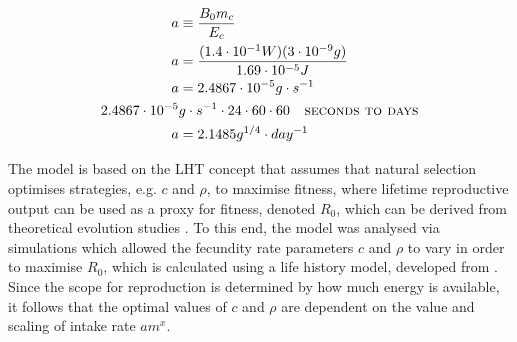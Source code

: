 \documentclass[a4paper]{article} %
\begin{document}
\begin{align*}
    a &\equiv \frac{B_{0}m_{c}}{E_{c}} \\
    a &= \frac{(1.4 \cdot 10^{-1} W)(3 \cdot 10^{-9} g)}{1.69 \cdot 10^{-5} J}\\
    a &= 2.4867 \cdot 10^{-5}g\cdot s^{-1} \\
    2.4867 \cdot 10^{-5}&g\cdot s^{-1} \cdot 24 \cdot 60 \cdot 60 \ \ \textsc{   seconds to days}\\
    a &= 2.1485 g^{1/4}\cdot day^{-1}
\end{align*}

The model is based on the LHT concept that assumes that natural selection optimises strategies, e.g. $c$ and $\rho$, to maximise fitness, where lifetime reproductive output can be used as a proxy for fitness, denoted $R_0$, which can be derived from theoretical evolution studies \autocite{Charnov2001, stearns1992evolution}. To this end, the model was analysed via simulations which allowed the fecundity rate parameters $c$ and $\rho$ to vary in order to maximise $R_0$, which is calculated using a life history model, developed from \cite{Charnov2001}. Since the scope for reproduction is determined by how much energy is available, it follows that the optimal values of $c$ and $\rho$ are dependent on the value and scaling of intake rate $am^{x}$. 
\end{document}
